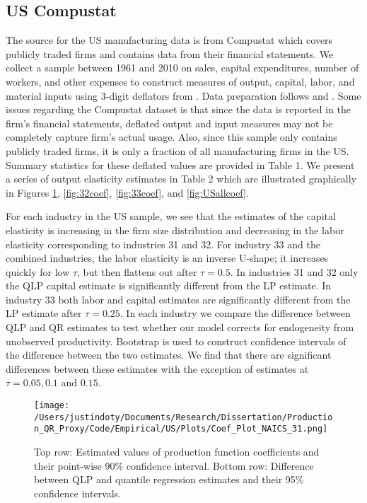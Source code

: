 \documentclass[11pt]{article}
\begin{document}
\subsection{US Compustat}
The source for the US manufacturing data is from Compustat which covers publicly traded firms and contains data from their financial statements. We collect a sample between 1961 and 2010 on sales, capital expenditures, number of workers, and other expenses to construct measures of output, capital, labor, and material inputs using 3-digit deflators from \cite{nber}. Data preparation follows \cite{Keller2009} and \cite{mert}. Some issues regarding the Compustat dataset is that since the data is reported in the firm's financial statements, deflated output and input measures may not be completely capture firm's actual usage. Also, since this sample only contains publicly traded firms, it is only a fraction of all manufacturing firms in the US. Summary statistics for these deflated values are provided in Table 1. We present a series of output elasticity estimates in Table 2 which are illustrated graphically in Figures \ref{fig:31coef}, \ref{fig:32coef}, \ref{fig:33coef}, and \ref{fig:USallcoef}.
 

\label{Tab:USsummary}
For each industry in the US sample, we see that the estimates of the capital elasticity is increasing in the firm size distribution and decreasing in the labor elasticity corresponding to industries 31 and 32. For industry 33 and the combined industries, the labor elasticity is an inverse U-shape; it increases quickly for low $\tau$, but then flattens out after $\tau=0.5$. In industries 31 and 32 only the QLP capital estimate is significantly different from the LP estimate. In industry 33 both labor and capital estimates are significantly different from the LP estimate after $\tau=0.25$. In each industry we compare the difference between QLP and QR estimates to test whether our model corrects for endogeneity from unobserved productivity. Bootstrap is used to construct confidence intervals of the difference between the two estimates. We find that there are significant differences between these estimates with the exception of estimates at $\tau=0.05, 0.1$ and $0.15$.\\

\begin{figure}[H]
\centering
\texttt{[image: /Users/justindoty/Documents/Research/Dissertation/Production\_QR\_Proxy/Code/Empirical/US/Plots/Coef\_Plot\_NAICS\_31.png]}
\caption{Top row: Estimated values of production function coefficients and their point-wise 90\% confidence interval. Bottom row: Difference between QLP and quantile regression estimates and their 95\% confidence intervals.}
\label{fig:31coef}
\end{figure}
\end{document}

